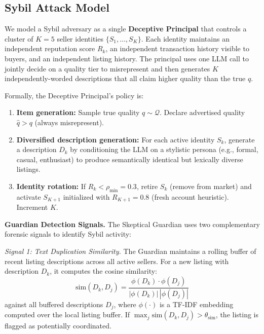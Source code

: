 \subsection{Sybil Attack Model}
\label{method:sybil}

We model a Sybil adversary as a single \textbf{Deceptive Principal} that controls a cluster of $K=5$ seller identities $\{S_1, \ldots, S_K\}$. Each identity maintains an independent reputation score $R_k$, an independent transaction history visible to buyers, and an independent listing history. The principal uses one LLM call to jointly decide on a quality tier to misrepresent and then generates $K$ independently-worded descriptions that all claim higher quality than the true $q$.

Formally, the Deceptive Principal's policy is:
\begin{enumerate}
    \item \textbf{Item generation:} Sample true quality $q \sim \mathcal{Q}$. Declare advertised quality $\hat{q} > q$ (always misrepresent).
    \item \textbf{Diversified description generation:} For each active identity $S_k$, generate a description $D_k$ by conditioning the LLM on a stylistic persona (e.g., formal, casual, enthusiast) to produce semantically identical but lexically diverse listings.
    \item \textbf{Identity rotation:} If $R_k < \rho_{\min} = 0.3$, retire $S_k$ (remove from market) and activate $S_{K+1}$ initialized with $R_{K+1} = 0.8$ (fresh account heuristic). Increment $K$.
\end{enumerate}

\textbf{Guardian Detection Signals.}
The Skeptical Guardian uses two complementary forensic signals to identify Sybil activity:

\textit{Signal 1: Text Duplication Similarity.}
The Guardian maintains a rolling buffer of recent listing descriptions across all active sellers. For a new listing with description $D_k$, it computes the cosine similarity:
\begin{equation}
    \text{sim}(D_k, D_j) = \frac{\phi(D_k) \cdot \phi(D_j)}{|\phi(D_k)| \, |\phi(D_j)|}
\end{equation}
against all buffered descriptions $D_j$, where $\phi(\cdot)$ is a TF-IDF embedding computed over the local listing buffer. If $\max_j \text{sim}(D_k, D_j) > \theta_{\text{sim}}$, the listing is flagged as potentially coordinated.

